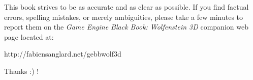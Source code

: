 This book strives to be as accurate and as clear as possible. If you find factual errors, spelling mistakes, or merely ambiguities, please take a few minutes to report them on the \textit{Game Engine Black Book: Wolfenstein 3D} companion web page located at:\\
\par
http://fabiensanglard.net/gebbwolf3d\\
\par
Thanks :) !